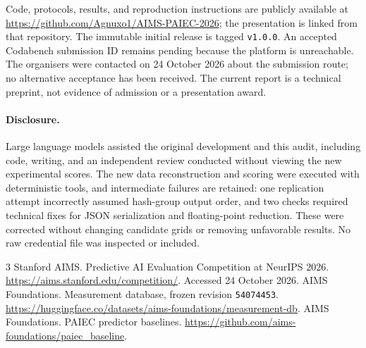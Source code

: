 \documentclass{article}
\begin{document}
Code, protocols, results, and reproduction instructions are publicly available
at \url{https://github.com/Agnuxo1/AIMS-PAIEC-2026}; the presentation is linked
from that repository. The immutable initial release is tagged \texttt{v1.0.0}.
An accepted Codabench submission ID remains pending because the platform is
unreachable. The organisers were contacted on 24 October 2026 about the
submission route; no alternative acceptance has been received. The current
report is a technical preprint, not evidence of admission or a presentation award.

\paragraph{Disclosure.}
Large language models assisted the original development and this audit,
including code, writing, and an independent review conducted without viewing
the new experimental scores. The new data reconstruction and scoring were
executed with deterministic tools, and intermediate failures are retained:
one replication attempt incorrectly assumed hash-group output order, and
two checks required technical fixes for JSON serialization and floating-point
reduction. These were corrected without changing candidate grids or removing
unfavorable results. No raw credential file was inspected or included.

\begin{thebibliography}{3}
 Stanford AIMS. Predictive AI Evaluation Competition at NeurIPS 2026.
\url{https://aims.stanford.edu/competition/}. Accessed 24 October 2026.
 AIMS Foundations. Measurement database, frozen revision
\texttt{54074453}. \url{https://huggingface.co/datasets/aims-foundations/measurement-db}.
 AIMS Foundations. PAIEC predictor baselines.
\url{https://github.com/aims-foundations/paiec_baseline}.
\end{thebibliography}
\end{document}
